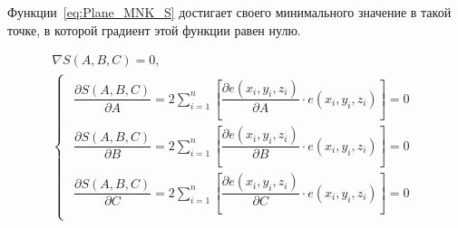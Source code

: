 Функции~\ref{eq:Plane_MNK_S} достигает своего минимального значение в такой точке, в которой градиент этой функции равен нулю.

\begin{gather*}
    \nabla S(A, B, C) = 0, \\
    \begin{cases}
        \begin{aligned}
            \dfrac{\partial S(A, B, C)}{\partial A} = 2 \sum_{i=1}^{n} \left[
            \dfrac{\partial e(x_i, y_i, z_i)}{\partial A} \cdot e(x_i, y_i, z_i) \right] = 0 \\
            \dfrac{\partial S(A, B, C)}{\partial B} = 2 \sum_{i=1}^{n} \left[
            \dfrac{\partial e(x_i, y_i, z_i)}{\partial B} \cdot e(x_i, y_i, z_i) \right] = 0 \\
            \dfrac{\partial S(A, B, C)}{\partial C} = 2 \sum_{i=1}^{n} \left[
            \dfrac{\partial e(x_i, y_i, z_i)}{\partial C} \cdot e(x_i, y_i, z_i) \right] = 0
        \end{aligned}
    \end{cases}
\end{gather*}


